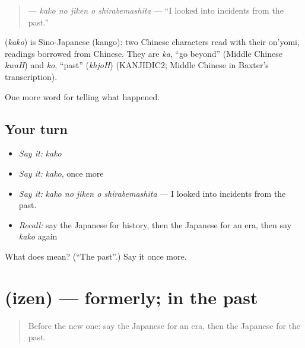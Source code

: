 \begin{quote}
\textbf{  } — \emph{kako no jiken o shirabemashita} — \textquotedblleft{}I looked into incidents from the past.\textquotedblright{}
\end{quote}

\begin{cousinweb}
\textbf{} (\emph{kako}) is Sino-Japanese (kango): two Chinese characters read with their on'yomi, readings borrowed from Chinese. They are \emph{ka}, \textquotedblleft{}go beyond\textquotedblright{} (Middle Chinese \emph{kwaH}) and \emph{ko}, \textquotedblleft{}past\textquotedblright{} (\emph{khjoH}) (KANJIDIC2; Middle Chinese in Baxter's transcription).
\end{cousinweb}

\begin{grammarlens}[title={What you've built}]
One more word for telling what happened.
\end{grammarlens}

\subsection*{Your turn}
\begin{itemize}
\raggedright
  \item \emph{Say it:} \emph{kako}
  \item \emph{Say it:} \emph{kako}, once more
  \item \emph{Say it:} \emph{kako no jiken o shirabemashita} — I looked into incidents from the past.
  \item \emph{Recall:} say the Japanese for history, then the Japanese for an era, then say \emph{kako} again
\end{itemize}

\begin{tcolorbox}[breakable,colback=teal!4,colframe=teal!35!black,title={Before you move on}]
What does  mean? (\textquotedblleft{}The past\textquotedblright{}.) Say it once more.
\end{tcolorbox}
\section[\texorpdfstring{\ja{いぜん} (izen)}{いぜん (izen)}]{ (izen) — formerly; in the past}

\label{lesson:JA-C312-izen}



\begin{quote}
Before the new one: say the Japanese for an era, then the Japanese for the past.
\end{quote}

